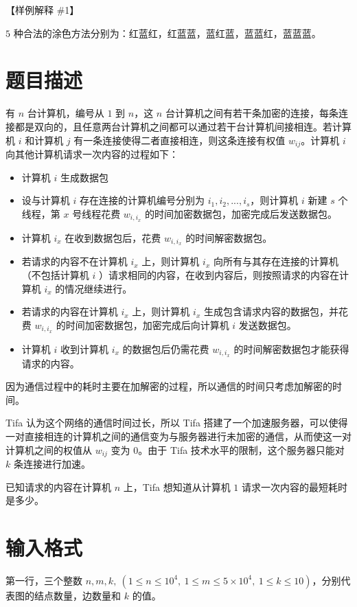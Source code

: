 \documentclass{../cpct/ctpro}
\begin{document}
【样例解释 \#1】

$5$ 种合法的涂色方法分别为：红蓝红，红蓝蓝，蓝红蓝，蓝蓝红，蓝蓝蓝。

\makeproblem
\section*{题目描述}

有 $n$ 台计算机，编号从 $1$ 到 $n$，这 $n$ 台计算机之间有若干条加密的连接，每条连接都是双向的，且任意两台计算机之间都可以通过若干台计算机间接相连。若计算机 $i$ 和计算机 $j$ 有一条连接使得二者直接相连，则这条连接有权值 $w_{ij}$。计算机 $i$ 向其他计算机请求一次内容的过程如下：

\begin{itemize}
    \item 计算机 $i$ 生成数据包
    \item 设与计算机 $i$ 存在连接的计算机编号分别为 $i_1,i_2,...,i_s$，则计算机 $i$ 新建 $s$ 个线程，第 $x$ 号线程花费 $w_{i,i_x}$ 的时间加密数据包，加密完成后发送数据包。
    \item 计算机 $i_x$ 在收到数据包后，花费 $w_{i,i_x}$ 的时间解密数据包。
    \item 若请求的内容不在计算机 $i_x$ 上，则计算机 $i_x$ 向所有与其存在连接的计算机（不包括计算机 $i$ ）请求相同的内容，在收到内容后，则按照请求的内容在计算机 $i_x$ 的情况继续进行。
    \item 若请求的内容在计算机 $i_x$ 上，则计算机 $i_x$ 生成包含请求内容的数据包，并花费 $w_{i,i_x}$ 的时间加密数据包，加密完成后向计算机 $i$ 发送数据包。
    \item 计算机 $i$ 收到计算机 $i_x$ 的数据包后仍需花费 $w_{i,i_x}$ 的时间解密数据包才能获得请求的内容。
\end{itemize}

因为通信过程中的耗时主要在加解密的过程，所以通信的时间只考虑加解密的时间。

Tifa 认为这个网络的通信时间过长，所以 Tifa 搭建了一个加速服务器，可以使得一对直接相连的计算机之间的通信变为与服务器进行未加密的通信，从而使这一对计算机之间的权值从 $w_{ij}$ 变为 $0$。由于 Tifa 技术水平的限制，这个服务器只能对 $k$ 条连接进行加速。

已知请求的内容在计算机 $n$ 上，Tifa 想知道从计算机 $1$ 请求一次内容的最短耗时是多少。

\section*{输入格式}

第一行，三个整数 $n,m,k,~(1 \leq n \leq {10}^4,~1 \leq m \leq 5 \times {10}^4,~1 \leq k \leq 10)$，分别代表图的结点数量，边数量和 $k$ 的值。
\end{document}
